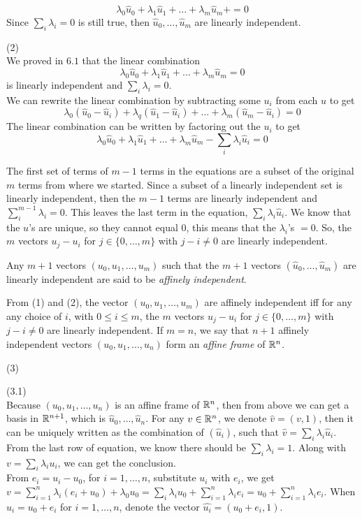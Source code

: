 \documentclass[12pt]{article}
\begin{document}
$$\lambda_0 \hat{u}_0  + \lambda_1 \hat{u}_1  + \ldots + \lambda_m \hat{u}_m  + = 0$$ Since $\sum_{i} \lambda_i = 0$ is still true, then $\hat{u}_0, \ldots, \hat{u}_m$ are linearly independent.   


\medskip
(2) \\
We proved in $6.1$ that the linear combination $$\lambda_0 \hat{u}_0  + \lambda_1 \hat{u}_1  + \ldots + \lambda_m \hat{u}_m  = 0$$ is linearly independent and $\sum_{i} \lambda_i = 0$. \\

We can rewrite the linear combination by subtracting some $u_i$ from each $u$ to get $$\lambda_0 (\hat{u}_0 - \hat{u}_i)  + \lambda_q (\hat{u}_1 - \hat{u}_i)+ \ldots + \lambda_m (\hat{u}_m - \hat{u}_i) = 0$$ The linear combination can be written by factoring out the $u_i$ to get  $$\lambda_0 \hat{u}_0  + \lambda_1 \hat{u}_1 + \ldots + \lambda_m \hat{u}_m  -  \sum_{i} \lambda_i \hat{u}_i= 0$$

The first set of terms of $m-1$ terms in the equations are a subset of the original $m$ terms from where we started. Since a subset of a linearly independent set is linearly independent, then the $m-1$ terms are linearly independent and $\sum_{i}^{m-1} \lambda_i =0$. This leaves the last term in the equation, $\sum_{i} \lambda_i \hat{u}_i$. We know that the $u$'s are unique, so they cannot equal $0$, this means that the $\lambda_i$'s $=0$. So, the
$m$ vectors $u_j - u_i$  for $j \in \{0, \ldots, m\}$ with $j - i \not = 0$
are linearly independent. 

\medskip
Any $m + 1$ vectors  $(u_0, u_1, \ldots, u_{m })$ such that
the  $m + 1$ vectors
$(\widehat{u}_0, \ldots,  \widehat{u}_m)$ are linearly independent
are said to be {\it affinely independent\/}.

\medskip
From (1) and (2), the vector $(u_0, u_1, \ldots, u_{m })$ 
are affinely independent iff
for any  any choice of $i$, with $0 \leq i \leq m$, the
$m$ vectors $u_j - u_i$  for $j \in \{0, \ldots, m\}$ with $j - i \not = 0$
are linearly independent.
If $m = n$,  we say that $n + 1$ affinely independent 
vectors  $(u_0, u_1, \ldots, u_{n })$ form an {\it affine frame\/} of $\mathbb{R}^n$. 

\medskip
(3) 

(3.1) \\
\medskip
Because $(u_0, u_1, \ldots, u_{n })$ is an affine frame of $\mathbb{R}^n$, then from above we can get a basis in $\mathbb{R}^{n+1}$, which is $\widehat{u}_0, \ldots,  \widehat{u}_{n}$. For any $v \in \mathbb{R}^n$, we denote $\widehat{v} = (v, 1)$, then it can be uniquely written as the combination of $(\widehat{u}_i)$, such that $\widehat{v} = \sum_i \lambda_i \widehat{u}_i$. From the last row of equation, we know there should be $\sum_i \lambda_i = 1$. Along with $v = \sum_i \lambda_i u_i$, we can get the conclusion.\\
\medskip
From $e_i = u_i -  u_0$, for $i = 1, \ldots, n$, substitute $u_i$ with $e_i$, we get $v = \sum_{i=1}^n \lambda_i (e_i + u_0) + \lambda_0 u_0 = \sum_i \lambda_i u_0 + \sum_{i=1}^n \lambda_i e_i = u_0 + \sum_{i=1}^n \lambda_i e_i$.
When $u_i = u_0 + e_i$ for $i = 1, \ldots, n$, denote the vector $\widehat{u_i} = (u_0 + e_i, 1)$. 
\end{document}

